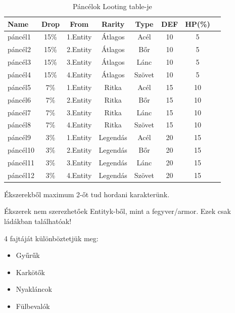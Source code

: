 \begin{table}[H]
\centering
\caption{Páncélok Looting table-je}
\label{tab:minta}
\begin{tabular}{|l|c|c|c|c|c|c|c|}
\hline
 Name & Drop & From  & Rarity & Type & DEF & HP(\%) \\
\hline
 páncél1 & 15\% & 1.Entity & Átlagos & Acél & 10 & 5 \\
\hline
 páncél2 & 15\% & 2.Entity & Átlagos & Bőr & 10 & 5 \\
\hline
 páncél3 & 15\% & 3.Entity & Átlagos & Lánc& 10 & 5\\
\hline
 páncél4 & 15\% & 4.Entity & Átlagos  & Szövet & 10 & 5\\
\hline
 páncél5 & 7\% & 1.Entity & Ritka & Acél & 15 & 10 \\
\hline
 páncél6 & 7\% & 2.Entity & Ritka & Bőr & 15 & 10 \\
\hline
 páncél7 & 7\% & 3.Entity & Ritka & Lánc & 15 & 10 \\
\hline
 páncél8 & 7\% & 4.Entity & Ritka  & Szövet & 15 & 10\\
 \hline
 páncél9 & 3\% & 1.Entity & Legendás & Acél & 20 & 15 \\
\hline
 páncél10 & 3\% & 2.Entity & Legendás & Bőr & 20 & 15 \\
\hline
 páncél11 & 3\% & 3.Entity & Legendás & Lánc & 20 & 15\\
\hline
 páncél12 & 3\% & 4.Entity & Legendás  & Szövet & 20 & 15\\
\hline
\end{tabular}
\end{table}

\noindent Ékszerekből maximum 2-őt tud hordani karakterünk.

\noindent Ékszerek nem szerezhetőek Entityk-ből, mint a fegyver/armor. Ezek csak ládákban találhatóak!

4 fajtáját különböztetjük meg:

\begin{itemize}
  \item Gyűrűk
  \item Karkötők
  \item Nyakláncok
  \item Fülbevalók
\end{itemize}

